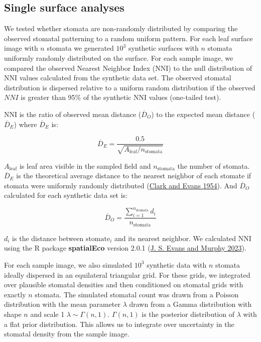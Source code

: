 \documentclass[12pt,halfline,a4paper,]{ouparticle}
\begin{document}
\hypertarget{single-surface-analyses}{%
\subsection{Single surface analyses}\label{single-surface-analyses}}

We tested whether stomata are non-randomly distributed by comparing the
observed stomatal patterning to a random uniform pattern. For each leaf
surface image with \(n\) stomata we generated \(10^3\) synthetic
surfaces with \(n\) stomata uniformly randomly distributed on the
surface. For each sample image, we compared the observed Nearest
Neighbor Index (\(\mathrm{NNI}\)) to the null distribution of
\(\mathrm{NNI}\) values calculated from the synthetic data set. The
observed stomatal distribution is dispersed relative to a uniform random
distribution if the observed \(NNI\) is greater than 95\% of the
synthetic \(\mathrm{NNI}\) values (one-tailed test).

\(\mathrm{NNI}\) is the ratio of observed mean distance
(\(\overline{D}_O\)) to the expected mean distance (\(\overline{D}_E\))
where \(\overline{D}_E\) is:

\begin{equation}\label{eq:emd}
  \overline{D}_E = \frac{0.5}{\sqrt{A_\text{leaf} / n_\text{stomata}}}
\end{equation}

\noindent \(A_\text{leaf}\) is leaf area visible in the sampled field
and \(n_\text{stomata}\) the number of stomata. \(\overline{D}_E\) is
the theoretical average distance to the nearest neighbor of each stomate
if stomata were uniformly randomly distributed
(\protect\hyperlink{ref-clark_distance_1954}{Clark and Evans 1954}). And
\(\overline{D}_O\) calculated for each synthetic data set is:

\begin{equation}\label{eq:omd}
  \overline{D}_O = \frac{\sum_{i=1}^{n_\text{stomata}}d_i}{n_\text{stomata}}
\end{equation}

\(d_i\) is the distance between \(\text{stomate}_i\) and its nearest
neighbor. We calculated \(\mathrm{NNI}\) using the R package
\textbf{spatialEco} version 2.0.1
(\protect\hyperlink{ref-evans_spatialeco_2023}{J. S. Evans and Murphy
2023}).

For each sample image, we also simulated \(10^3\) synthetic data with
\(n\) stomata ideally dispersed in an equilateral triangular grid. For
these grids, we integrated over plausible stomatal densities and then
conditioned on stomatal grids with exactly \(n\) stomata. The simulated
stomatal count was drawn from a Poisson distribution with the mean
parameter \(\lambda\) drawn from a Gamma distribution with shape \(n\)
and scale 1 \(\lambda \sim \Gamma(n, 1)\). \(\Gamma(n, 1)\) is the
posterior distribution of \(\lambda\) with a flat prior distribution.
This allows us to integrate over uncertainty in the stomatal density
from the sample image.
\end{document}
